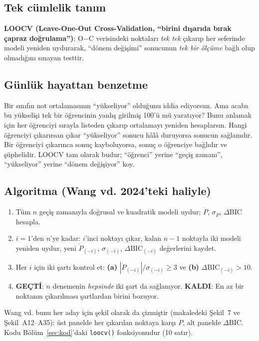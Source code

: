 \subsection{Tek cümlelik tanım}
\textbf{LOOCV (Leave-One-Out Cross-Validation, “birini dışarıda bırak çapraz doğrulama”)}: O$-$C verisindeki
noktaları \emph{tek tek} çıkarıp her seferinde modeli yeniden uydurarak, “dönem değişimi” sonucunun
\emph{tek bir ölçüme} bağlı olup olmadığını sınayan testtir.

\subsection{Günlük hayattan benzetme}
Bir sınıfın not ortalamasının “yükseliyor” olduğunu iddia ediyorsun. Ama acaba bu yükselişi tek bir öğrencinin
yanlış girilmiş 100'ü mü yaratıyor? Bunu anlamak için her öğrenciyi sırayla listeden çıkarıp ortalamayı yeniden
hesaplarsın. Hangi öğrenciyi çıkarırsan çıkar “yükseliyor” sonucu hâlâ duruyorsa sonucun sağlamdır.
Bir öğrenciyi çıkarınca sonuç kayboluyorsa, sonuç o öğrenciye bağlıdır ve şüphelidir. LOOCV tam olarak budur;
“öğrenci” yerine “geçiş zamanı”, “yükseliyor” yerine “dönem değişiyor” koy.

\subsection{Algoritma (Wang vd. 2024'teki haliyle)}
\begin{enumerate}[leftmargin=*]
\item Tüm $n$ geçiş zamanıyla doğrusal ve kuadratik modeli uydur; $\dot P$, $\sigma_{\dot P}$, $\Delta$BIC hesapla.
\item $i = 1$'den $n$'ye kadar: $i$'inci noktayı çıkar, kalan $n-1$ noktayla iki modeli yeniden uydur,
      yeni $\dot P_{(-i)}$, $\sigma_{(-i)}$, $\Delta\mathrm{BIC}_{(-i)}$ değerlerini kaydet.
\item Her $i$ için iki şartı kontrol et: \textbf{(a)} $|\dot P_{(-i)}|/\sigma_{(-i)} \ge 3$ ve
      \textbf{(b)} $\Delta\mathrm{BIC}_{(-i)} > 10$.
\item \textbf{GEÇTİ}: $n$ denemenin \emph{hepsinde} iki şart da sağlanıyor.
      \textbf{KALDI}: En az bir noktanın çıkarılması şartlardan birini bozuyor.
\end{enumerate}
Wang vd. bunu her aday için şekil olarak da çizmiştir (makaledeki Şekil~7 ve Şekil~A12–A35): üst panelde
her çıkarılan noktaya karşı $\dot P$, alt panelde $\Delta$BIC. Kodu Bölüm~\ref{sec:kod}'daki \texttt{loocv()}
fonksiyonudur (10 satır).

